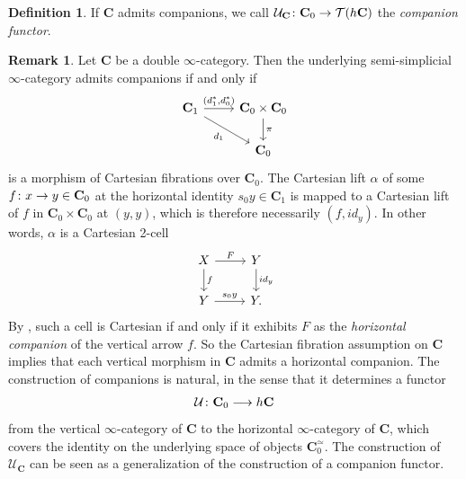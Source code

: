 \documentclass[10pt]{amsart}
\numberwithin{equation}{section}
\theoremstyle{definition}
\newtheorem{definition}[prop]{Definition}
\newtheorem{rem}[prop]{Remark}
\newcommand{\cT}{\mathcal{T}}
\newcommand{\cU}{\mathcal{U}}
\newcommand{\bfC}{\mathbf{C}}
\renewcommand{\to}{\mathchoice{\longrightarrow}{\rightarrow}{}{}}
\begin{document}
	\begin{definition}\label{def:companion_functor}
		If $\bfC$ admits companions, we call $\cU_{\bfC} \colon \bfC_{0} \to \cT(h\bfC)$ the \emph{companion functor}.
	\end{definition}

	\begin{rem}\label{rem:companions_in_double}
		Let $\bfC$ be a double $\infty$-category.
    Then the underlying semi-simplicial $\infty$-category admits companions if and only if
		\begin{equation*}
			\begin{tikzcd}
				\bfC_{1} \arrow[r, "{(d_{1}^{*},d_{0}^{*})}"] \arrow[dr, "d_{1}"']      &   \bfC_{0}\times \bfC_{0}  \arrow[d, "\pi"] \\
				&   \bfC_{0}
			\end{tikzcd}
		\end{equation*}
		is a morphism of Cartesian fibrations over $\bfC_{0}$.
    The Cartesian lift $\alpha$ of some $f\colon x\to y \in \bfC_{0}$ at the horizontal identity $s_{0}y\in \bfC_{1}$ is mapped to a Cartesian lift of $f$ in $\bfC_{0}\times \bfC_{0}$ at $(y,y)$, which is therefore necessarily $(f, id_{y})$. In other words, $\alpha$ is a Cartesian 2-cell
		\begin{equation*}
			\begin{tikzcd}
				X \arrow[r, "F"] \arrow[d, "f"]      &   Y  \arrow[d, "id_{y}"] \\
				Y  \arrow[r, "s_{0}y"]               &   Y.
			\end{tikzcd}
		\end{equation*}
		By \cite*[Corollary 5.16]{ruit2025companion}, such a cell is Cartesian if and only if it exhibits $F$ as the \emph{horizontal companion} of the vertical arrow $f$. So the Cartesian fibration assumption on $\bfC$ implies that each vertical morphism in $\bfC$ admits a horizontal companion. The construction of companions is natural, in the sense that it determines a functor
		\begin{align*}
			\cU \colon \bfC_{0} \to h\bfC
		\end{align*}
		from the vertical $\infty$-category of $\bfC$ to the horizontal $\infty$-category of $\bfC$, which covers the identity on the underlying space of objects $\bfC_{0}^{\simeq}$. The construction of $\cU_{\bfC}$ can be seen as a generalization of the construction of a companion functor.
	\end{rem}
\end{document}
